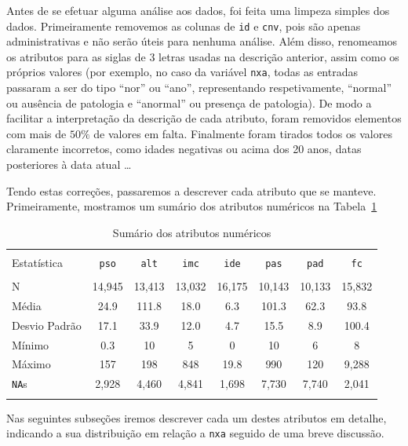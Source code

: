 \documentclass[10pt, conference, compsocconf]{IEEEtran}
\begin{document}
Antes de se efetuar alguma análise aos dados, foi feita uma limpeza
simples dos dados. Primeiramente removemos as colunas de {\tt id} e
{\tt cnv}, pois são apenas administrativas e não serão úteis para
nenhuma análise. Além disso, renomeamos os atributos para as siglas de
3 letras usadas na descrição anterior, assim como os próprios valores
(por exemplo, no caso da variável {\tt nxa}, todas as entradas
passaram a ser do tipo ``nor'' ou ``ano'', representando
respetivamente, ``normal'' ou ausência de patologia e ``anormal'' ou
presença de patologia). De modo a facilitar a interpretação da
descrição de cada atributo, foram removidos elementos com mais de
$50\%$ de valores em falta. Finalmente foram tirados todos os valores
claramente incorretos, como idades negativas ou acima dos 20 anos,
datas posteriores à data atual \ldots

Tendo estas correções, passaremos a descrever cada atributo que se
manteve. Primeiramente, mostramos um sumário dos atributos numéricos
na Tabela~\ref{tab:nua}

\begin{table}[!ht] \centering 
  \caption{Sumário dos atributos numéricos}
  \label{tab:nua} 
  \begin{tabular}{@{\extracolsep{5pt}}lccccccc} 
    \\[-1.8ex]\hline 
    \hline \\[-1.8ex] 
    Estatística & {\tt pso} & {\tt alt} & {\tt imc} & {\tt ide} & {\tt pas} & {\tt pad} & {\tt fc} \\ 
    \hline \\[-1.8ex] 
    N & 14,945 & 13,413 & 13,032 & 16,175 & 10,143 & 10,133 & 15,832 \\ 
    Média & 24.9 & 111.8 & 18.0 & 6.3 & 101.3 & 62.3 & 93.8 \\ 
    Desvio Padrão & 17.1 & 33.9 & 12.0 & 4.7 & 15.5 & 8.9 & 100.4 \\ 
    Mínimo & 0.3 & 10 & 5 & 0 & 10 & 6 & 8 \\ 
    Máximo & 157 & 198 & 848 & 19.8 & 990 & 120 & 9,288 \\ 
    {\tt NA}s & 2,928 & 4,460 & 4,841 & 1,698 & 7,730 & 7,740 & 2,041\\
    \hline \\[-1.8ex] 
  \end{tabular}
\end{table}

Nas seguintes subseções iremos descrever cada um destes atributos em
detalhe, indicando a sua distribuição em relação a {\tt nxa} seguido
de uma breve discussão.
\end{document}
